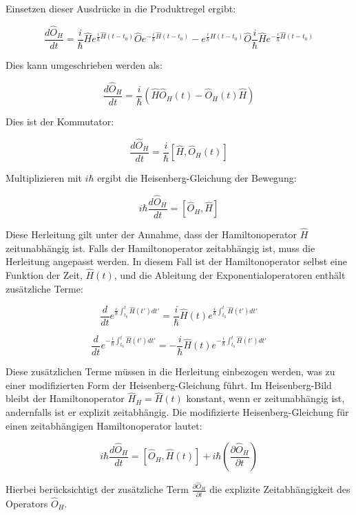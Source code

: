 \documentclass[11pt,a4paper]{article}
\begin{document}
Einsetzen dieser Ausdrücke in die Produktregel ergibt:

\[
\frac{d \hat{O}_H}{d t} = \frac{i}{\hbar} \hat{H} e^{\frac{i}{\hbar} \hat{H}(t-t_0)} \hat{O} e^{-\frac{i}{\hbar} \hat{H}(t-t_0)} - e^{\frac{i}{\hbar} \hat{H}(t-t_0)} \hat{O} \frac{i}{\hbar} \hat{H} e^{-\frac{i}{\hbar} \hat{H}(t-t_0)}
\]

Dies kann umgeschrieben werden als:

\[
\frac{d \hat{O}_H}{d t} = \frac{i}{\hbar} \left( \hat{H} \hat{O}_H(t) - \hat{O}_H(t) \hat{H} \right)
\]

Dies ist der Kommutator:

\[
\frac{d \hat{O}_H}{d t} = \frac{i}{\hbar} [\hat{H}, \hat{O}_H(t)]
\]

Multiplizieren mit \(i \hbar\) ergibt die Heisenberg-Gleichung der Bewegung:

\[
i \hbar \frac{d \hat{O}_H}{d t} = [\hat{O}_H, \hat{H}]
\]

Diese Herleitung gilt unter der Annahme, dass der Hamiltonoperator \(\hat{H}\) zeitunabhängig ist. Falls der Hamiltonoperator zeitabhängig ist, muss die Herleitung angepasst werden. In diesem Fall ist der Hamiltonoperator selbst eine Funktion der Zeit, \(\hat{H}(t)\), und die Ableitung der Exponentialoperatoren enthält zusätzliche Terme:

\[
\frac{d}{d t} e^{\frac{i}{\hbar} \int_{t_0}^{t} \hat{H}(t') dt'} = \frac{i}{\hbar} \hat{H}(t) e^{\frac{i}{\hbar} \int_{t_0}^{t} \hat{H}(t') dt'}
\]

\[
\frac{d}{d t} e^{-\frac{i}{\hbar} \int_{t_0}^{t} \hat{H}(t') dt'} = -\frac{i}{\hbar} \hat{H}(t) e^{-\frac{i}{\hbar} \int_{t_0}^{t} \hat{H}(t') dt'}
\]

Diese zusätzlichen Terme müssen in die Herleitung einbezogen werden, was zu einer modifizierten Form der Heisenberg-Gleichung führt. Im Heisenberg-Bild bleibt der Hamiltonoperator \(\hat{H}_H = \hat{H}(t)\) konstant, wenn er zeitunabhängig ist, andernfalls ist er explizit zeitabhängig. Die modifizierte Heisenberg-Gleichung für einen zeitabhängigen Hamiltonoperator lautet:

\[
i \hbar \frac{d \hat{O}_H}{d t} = [\hat{O}_H, \hat{H}(t)] + i \hbar \left(\frac{\partial \hat{O}_H}{\partial t}\right)
\]

Hierbei berücksichtigt der zusätzliche Term \(\frac{\partial \hat{O}_H}{\partial t}\) die explizite Zeitabhängigkeit des Operators \(\hat{O}_H\).
\end{document}
